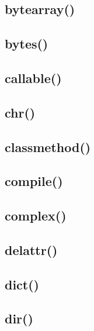 \documentclass{article}
\begin{document}
\subsection{bytearray()}
%

\subsection{bytes()}
%

\subsection{callable()}
%

\subsection{chr()}
%

\subsection{classmethod()}
%

\subsection{compile()}
%

\subsection{complex()}
%

\subsection{delattr()}
%

\subsection{dict()}
%

\subsection{dir()}
%
\end{document}
